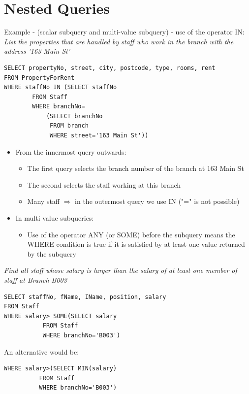 \documentclass{article}[18pt]
\begin{document}
\section{Nested Queries}
Example - (scalar subquery and multi-value subquery) - use of the operator IN:\\
\textit{List the properties that are handled by staff who work in the branch with the address '163 Main St'}
\begin{verbatim}
SELECT propertyNo, street, city, postcode, type, rooms, rent
FROM PropertyForRent
WHERE staffNo IN (SELECT staffNo
		FROM Staff
		WHERE branchNo=
			(SELECT branchNo
			 FROM branch
			 WHERE street='163 Main St'))
\end{verbatim}
\begin{itemize}
	\item From the innermost query outwards:
	\begin{itemize}
		\item The first query selects the branch number of the branch at 163 Main St
		\item The second selects the staff working at this branch
		\item Many staff $\Rightarrow$ in the outermost query we use IN ("=" is not possible)
	\end{itemize}
	\item In multi value subqueries:
	\begin{itemize}
		\item Use of the operator ANY (or SOME) before the subquery means the WHERE condition is true if it is satisfied by at least one value returned by the subquery
	\end{itemize}
\end{itemize}
\textit{Find all staff whose salary is larger than the salary of at least one member of staff at Branch B003}
\begin{verbatim}
SELECT staffNo, fName, IName, position, salary
FROM Staff
WHERE salary> SOME(SELECT salary
		   FROM Staff
		   WHERE branchNo='B003')
\end{verbatim}
An alternative would be:
\begin{verbatim}
WHERE salary>(SELECT MIN(salary)
	      FROM Staff
	      WHERE branchNo='B003')
\end{verbatim}
\end{document}
